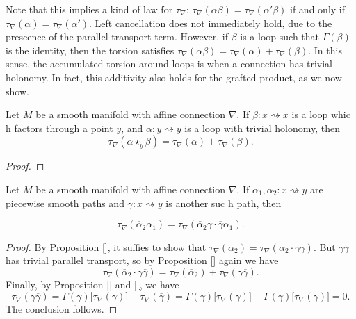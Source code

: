 Note that this implies a kind of  law for $\tau_\nabla$: $\tau_\nabla(\alpha \beta) = \tau_\nabla(\alpha' \beta)$ if and only if $\tau_\nabla(\alpha) = \tau_\nabla(\alpha')$. Left cancellation does not immediately hold, due to the prescence of the parallel transport term. However, if $\beta$ is a loop such that $\Gamma(\beta)$ is the identity, then the torsion satisfies $\tau_\nabla(\alpha\beta) = \tau_\nabla(\alpha) + \tau_\nabla(\beta)$. In this sense, the accumulated torsion around loops is  when a connection has trivial holonomy. In fact, this additivity also holds for the grafted product, as we now show.
\begin{proposition}
  Let $M$ be a smooth manifold with affine connection $\nabla$. If $\beta \colon x \rightsquigarrow x$ is a loop whic\kern0pt h factors through a point $y$, and $\alpha \colon y \rightsquigarrow y$ is a loop with trivial holonomy, then 
  \begin{equation}
    \tau_\nabla (\alpha \star_y \beta) = \tau_\nabla(\alpha) + \tau_\nabla(\beta).
  \end{equation}
\end{proposition}
\begin{proof}
  
\end{proof}
 

\begin{proposition}
  Let $M$ be a smooth manifold with affine connection $\nabla$. If $\alpha_1, \alpha_2 \colon x \rightsquigarrow y$ are piecewise smooth paths and $\gamma \colon x \rightsquigarrow y$ is another suc\kern0pt h path, then

  \begin{equation}
    \tau_\nabla(\overline{\alpha}_2 \alpha_1) = \tau_\nabla( \overline{\alpha}_2 \gamma \cdot \overline{\gamma}\alpha_1).
  \end{equation}
\end{proposition}

\begin{proof}
  By Proposition \ref{}, it suffies to show that $\tau_\nabla(\overline{\alpha}_2) = \tau_\nabla(\overline{\alpha}_2 \cdot \gamma \overline{\gamma})$. But $\gamma \overline{\gamma}$ has trivial parallel transport, so by Proposition \ref{} again we have
  \begin{equation}
    \tau_\nabla( \overline{\alpha}_2 \cdot \gamma \overline{\gamma}) = \tau_\nabla( \overline{\alpha}_2) + \tau_\nabla(\gamma \overline{\gamma}).
  \end{equation}
  Finally, by Proposition \ref{} and \ref{}, we have
  \begin{equation*}
    \tau_\nabla(\gamma \overline{\gamma}) = \Gamma(\gamma)\big[\tau_\nabla(\gamma)\big] + \tau_\nabla(\overline{\gamma}) = \Gamma(\gamma)\big[\tau_\nabla(\gamma)\big] - \Gamma(\gamma)\big[\tau_\nabla(\gamma)\big] = 0.
  \end{equation*}
  The conclusion follows.
\end{proof}

